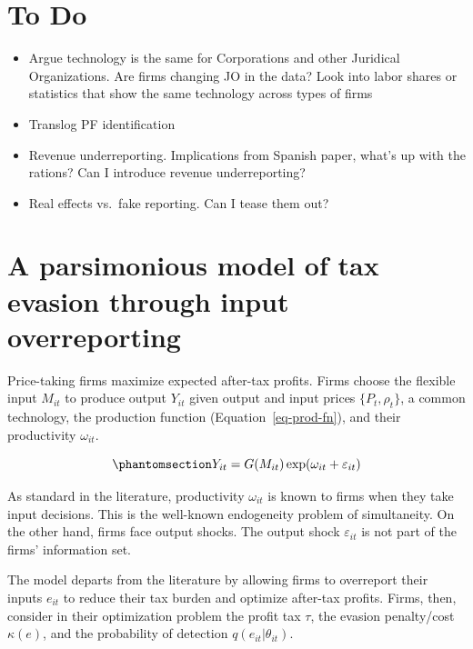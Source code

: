 \documentclass[
  12pt]{article}
\providecommand{\tightlist}{%
  \setlength{\itemsep}{0pt}\setlength{\parskip}{0pt}}\usepackage{longtable,booktabs,array}
\begin{document}
\section*{To Do}\label{to-do}

\begin{itemize}
\tightlist
\item
  Argue technology is the same for Corporations and other Juridical
  Organizations. Are firms changing JO in the data? Look into labor
  shares or statistics that show the same technology across types of
  firms
\item
  Translog PF identification
\item
  Revenue underreporting. Implications from Spanish paper, what's up
  with the rations? Can I introduce revenue underreporting?
\item
  Real effects vs.~fake reporting. Can I tease them out?
\end{itemize}

\section{A parsimonious model of tax evasion through input
overreporting}\label{a-parsimonious-model-of-tax-evasion-through-input-overreporting}

Price-taking firms maximize expected after-tax profits. Firms choose the
flexible input \(M_{it}\) to produce output \(Y_{it}\) given output and
input prices \(\{P_{t}, \rho_t\}\), a common technology, the production
function (Equation~\ref{eq-prod-fn}), and their productivity
\(\omega_{it}\).

\begin{equation}\phantomsection\label{eq-prod-fn}{
Y_{it}=G(M_{it})\exp(\omega_{it}+\varepsilon_{it})
}\end{equation}

As standard in the literature, productivity \(\omega_{it}\) is known to
firms when they take input decisions. This is the well-known endogeneity
problem of simultaneity. On the other hand, firms face output shocks.
The output shock \(\varepsilon_{it}\) is not part of the firms'
information set.

The model departs from the literature by allowing firms to overreport
their inputs \(e_{it}\) to reduce their tax burden and optimize
after-tax profits. Firms, then, consider in their optimization problem
the profit tax \(\tau\), the evasion penalty/cost \(\kappa(e)\), and the
probability of detection \(q(e_{it}|\theta_{it})\).
\end{document}
